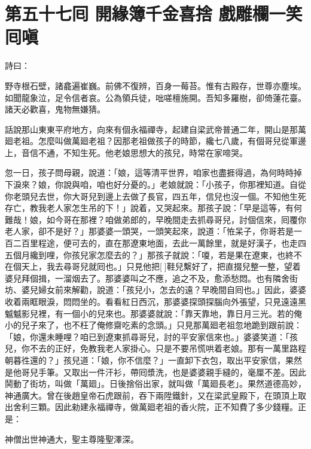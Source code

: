 
\chapter*{第五十七囘 開緣簿千金喜捨 戲雕欄一笑囘嗔}


詩曰：

野寺根石壁，諸龕遍崔巍。前佛不復辨，百身一莓苔。惟有古殿存，世尊亦塵埃。如聞龍象泣，足令信者哀。公為領兵徒，咄嗟檀施開。吾知多羅樹，卻倚蓮花臺。諸天必歡喜，鬼物無嫌猜。

話說那山東東平府地方，向來有個永福禪寺，起建自梁武帝普通二年，開山是那萬廻老祖。怎麼叫做萬廻老祖？因那老祖做孩子的時節，纔七八歲，有個哥兒從軍邊上，音信不通，不知生死。他老娘思想大的孩兒，時常在家啼哭。

忽一日，孩子問母親，說道：「娘，這等清平世界，咱家也盡捱得過，為何時時掉下淚來？娘，你說與咱，咱也好分憂的。」老娘就說：「小孩子，你那裡知道。自從你老頭兒去世，你大哥兒到邊上去做了長官，四五年，信兒也沒一個。不知他生死存亡，教我老人家怎生吊的下！」說着，又哭起來。那孩子說：「早是這等，有何難哉！娘，如今哥在那裡？咱做弟郎的，早晚間走去抓尋哥兒，討個信來，囘覆你老人家，卻不是好？」那婆婆一頭哭，一頭笑起來，說道：「恠呆子，你哥若是一百二百里程途，便可去的，直在那遼東地面，去此一萬餘里，就是好漢子，也走四五個月纔到哩，你孩兒家怎麼去的？」那孩子就說：「嗄，若是果在遼東，也終不在個天上，我去尋哥兒就囘也。」只見他把[]鞋兒繫好了，把直掇兒整一整，望着婆兒拜個揖，一溜烟去了。那婆婆叫之不應，追之不及，愈添愁悶。也有隣舍街坊、婆兒婦女前來解勸，說道：「孩兒小，怎去的遠？早晚間自囘也。」因此，婆婆收着兩眶眼淚，悶悶坐的。看看紅日西沉，那婆婆探頭探腦向外張望，只見遠遠黑魆魆影兒裡，有一個小的兒來也。那婆婆就說：「靠天靠地，靠日月三光。若的俺小的兒子來了，也不枉了俺修齋吃素的念頭。」只見那萬廻老祖忽地跪到跟前說：「娘，你還未睡哩？咱已到遼東抓尋哥兒，討的平安家信來也。」{}婆婆笑道：「孩兒，你不去的正好，免教我老人家掛心。只是不要吊慌哄着老娘。那有一萬里路程朝暮徃還的？」孩兒道：「娘，你不信麼？」一直卸下衣包，取出平安家信，果然是他哥兒手筆。又取出一件汗衫，帶囘漿洗，也是婆婆親手縫的，毫厘不差。因此鬨動了街坊，叫做「萬廻」。日後捨俗出家，就叫做「萬廻長老」。果然道德高妙，神通廣大。曾在後趙皇帝石虎跟前，吞下兩陞鐵針，又在梁武皇殿下，在頭頂上取出舍利三顆。因此勑建永福禪寺，做萬廻老祖的香火院，正不知費了多少錢糧。正是：

神僧出世神通大，聖主尊隆聖澤深。


